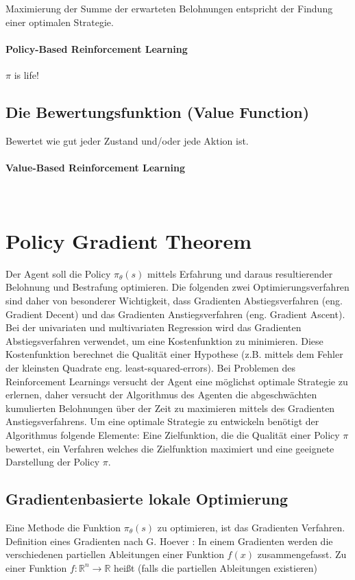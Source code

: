 \documentclass[conference]{IEEEtran}
\begin{document}
Maximierung der Summe der erwarteten Belohnungen entspricht der Findung einer optimalen Strategie. \\

\paragraph*{Policy-Based Reinforcement Learning} 

$\pi$ is life!


\subsection{Die Bewertungsfunktion (Value Function)}
Bewertet wie gut jeder Zustand und/oder jede Aktion ist. \\

\paragraph*{Value-Based Reinforcement Learning} \mbox{}\\



\section{Policy Gradient Theorem}
Der Agent soll die Policy $\pi_\theta(s)$ mittels Erfahrung und daraus resultierender Belohnung und Bestrafung optimieren. Die folgenden zwei Optimierungsverfahren sind daher von besonderer Wichtigkeit, dass Gradienten Abstiegsverfahren (eng. Gradient Decent) und das Gradienten Anstiegsverfahren (eng. Gradient Ascent). Bei der univariaten und multivariaten Regression wird das Gradienten Abstiegsverfahren verwendet, um eine Kostenfunktion zu minimieren. Diese Kostenfunktion berechnet die Qualität einer Hypothese (z.B. mittels dem Fehler der kleinsten Quadrate eng. least-squared-errors). Bei Problemen des Reinforcement Learnings versucht der Agent eine möglichst optimale Strategie zu erlernen, daher versucht der Algorithmus des Agenten die abgeschwächten kumulierten Belohnungen über der Zeit zu maximieren mittels des Gradienten Anstiegsverfahrens. Um eine optimale Strategie zu entwickeln benötigt der Algorithmus folgende Elemente: Eine Zielfunktion, die die Qualität einer Policy $\pi$ bewertet, ein Verfahren welches die Zielfunktion maximiert und eine geeignete Darstellung der Policy $\pi$.

\subsection{Gradientenbasierte lokale Optimierung}
Eine Methode die Funktion $\pi_\theta(s)$ zu optimieren, ist das Gradienten Verfahren. Definition eines Gradienten nach G. Hoever \cite[vgl. S. 213]{hoever_14}: In einem Gradienten werden die verschiedenen partiellen Ableitungen einer Funktion $f(x)$ zusammengefasst. Zu einer Funktion $f : \mathbb{R}^n \rightarrow \mathbb{R}$ heißt (falls die partiellen Ableitungen existieren)
\end{document}
